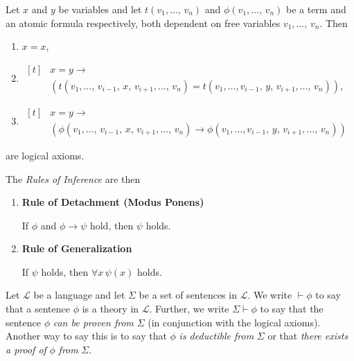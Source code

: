 \documentclass[../../main.tex]{subfiles}
\begin{document}
\begin{definition}
\begin{enumerate}
        Let $x$ and $y$ be variables and let $t(v_1,\ldots,\, v_n)$ and $\phi(v_1,\ldots,\, v_n)$ be a term and an atomic formula respectively,
        both dependent on free variables $v_1,\ldots,\, v_n$.
        Then 
        \begin{enumerate}
            \item $x = x$,
            \item $\begin{aligned}[t]
                & x = y \rightarrow \\
                & \left(t(v_1,\ldots,\, v_{i-1},\, x,\, v_{i+1},\ldots,\, v_n) = t(v_1,\ldots,v_{i-1},\, y,\, v_{i+1},\ldots,\, v_n)\right),
            \end{aligned}$
            \item $\begin{aligned}[t]
                & x = y \rightarrow \\
                & \left(\phi(v_1,\ldots,\, v_{i-1},\, x,\, v_{i+1},\ldots,\, v_n) \rightarrow \phi(v_1,\ldots,v_{i-1},\, y,\, v_{i+1},\ldots,\, v_n)\right)
            \end{aligned}$
        \end{enumerate}
        are logical axioms.
    \end{enumerate}
    The \textit{Rules of Inference} are then
    \begin{enumerate}[resume]
        \item\label{detachment-rule} \textbf{Rule of Detachment (Modus Ponens)}
        
        If $\phi$ and $\phi \rightarrow \psi$ hold, then $\psi$ holds.
        \item\label{generalization-rule} \textbf{Rule of Generalization}
        
        If $\psi$ holds, then $\forall x\, \psi(x)$ holds.
    \end{enumerate}
\end{definition}

\begin{definition}[Proof]\label{proof-def}\cite[p.25]{Cha90}
    Let $\mathcal{L}$ be a language and let $\Sigma$ be a set of sentences in $\mathcal{L}$.
    We write $\vdash \phi$ to say that a sentence $\phi$ is a theory in $\mathcal{L}$.
    Further, we write $\Sigma \vdash \phi$ to say that the sentence $\phi$ \textit{can be proven from} $\Sigma$ (in conjunction with the logical axioms).
    Another way to say this is to say that $\phi$ \textit{is deductible from} $\Sigma$ or that \textit{there exists a proof of} $\phi$ \textit{from} $\Sigma$.
\end{definition}
\end{document}
